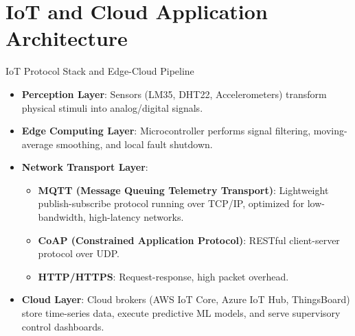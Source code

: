 \section{IoT and Cloud Application Architecture}

\begin{formulabox}{IoT Protocol Stack and Edge-Cloud Pipeline}
\begin{itemize}[leftmargin=1.5em]
    \item \textbf{Perception Layer}: Sensors (LM35, DHT22, Accelerometers) transform physical stimuli into analog/digital signals.
    \item \textbf{Edge Computing Layer}: Microcontroller performs signal filtering, moving-average smoothing, and local fault shutdown.
    \item \textbf{Network Transport Layer}:
    \begin{itemize}
        \item \textbf{MQTT (Message Queuing Telemetry Transport)}: Lightweight publish-subscribe protocol running over TCP/IP, optimized for low-bandwidth, high-latency networks.
        \item \textbf{CoAP (Constrained Application Protocol)}: RESTful client-server protocol over UDP.
        \item \textbf{HTTP/HTTPS}: Request-response, high packet overhead.
    \end{itemize}
    \item \textbf{Cloud Layer}: Cloud brokers (AWS IoT Core, Azure IoT Hub, ThingsBoard) store time-series data, execute predictive ML models, and serve supervisory control dashboards.
\end{itemize}
\end{formulabox}
